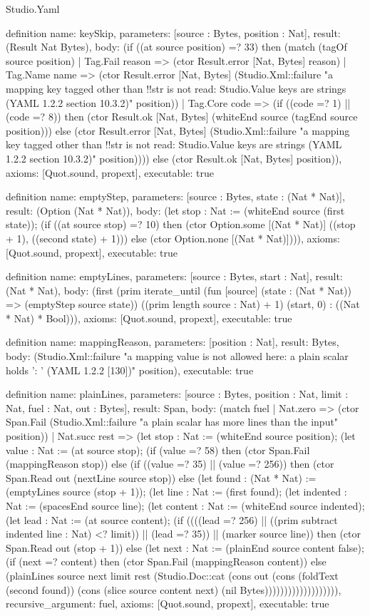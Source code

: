 \begin{lexlean}{Studio.Yaml}
\begin{semanticmodule}
definition{
  name: keySkip,
  parameters: [source : Bytes, position : Nat],
  result: (Result Nat Bytes),
  body: (if ((at source position) =? 33) then (match (tagOf source position)
    | Tag.Fail reason => (ctor Result.error [Nat, Bytes] reason)
    | Tag.Name name => (ctor Result.error [Nat, Bytes] (Studio.Xml::failure "a mapping key tagged other than !!str is not read: Studio.Value keys are strings (YAML 1.2.2 section 10.3.2)" position))
    | Tag.Core code => (if ((code =? 1) || (code =? 8)) then (ctor Result.ok [Nat, Bytes] (whiteEnd source (tagEnd source position))) else (ctor Result.error [Nat, Bytes] (Studio.Xml::failure "a mapping key tagged other than !!str is not read: Studio.Value keys are strings (YAML 1.2.2 section 10.3.2)" position)))) else (ctor Result.ok [Nat, Bytes] position)),
  axioms: [Quot.sound, propext],
  executable: true
}

definition{
  name: emptyStep,
  parameters: [source : Bytes, state : (Nat * Nat)],
  result: (Option (Nat * Nat)),
  body: (let stop : Nat := (whiteEnd source (first state)); (if ((at source stop) =? 10) then (ctor Option.some [(Nat * Nat)] ((stop + 1), ((second state) + 1))) else (ctor Option.none [(Nat * Nat)]))),
  axioms: [Quot.sound, propext],
  executable: true
}

definition{
  name: emptyLines,
  parameters: [source : Bytes, start : Nat],
  result: (Nat * Nat),
  body: (first (prim iterate_until (fun [source] (state : (Nat * Nat)) => (emptyStep source state)) ((prim length source : Nat) + 1) (start, 0) : ((Nat * Nat) * Bool))),
  axioms: [Quot.sound, propext],
  executable: true
}

definition{
  name: mappingReason,
  parameters: [position : Nat],
  result: Bytes,
  body: (Studio.Xml::failure "a mapping value is not allowed here: a plain scalar holds ': ' (YAML 1.2.2 [130])" position),
  executable: true
}

definition{
  name: plainLines,
  parameters: [source : Bytes, position : Nat, limit : Nat, fuel : Nat, out : Bytes],
  result: Span,
  body: (match fuel
    | Nat.zero => (ctor Span.Fail (Studio.Xml::failure "a plain scalar has more lines than the input" position))
    | Nat.succ rest => (let stop : Nat := (whiteEnd source position); (let value : Nat := (at source stop); (if (value =? 58) then (ctor Span.Fail (mappingReason stop)) else (if ((value =? 35) || (value =? 256)) then (ctor Span.Read out (nextLine source stop)) else (let found : (Nat * Nat) := (emptyLines source (stop + 1)); (let line : Nat := (first found); (let indented : Nat := (spacesEnd source line); (let content : Nat := (whiteEnd source indented); (let lead : Nat := (at source content); (if ((((lead =? 256) || ((prim subtract indented line : Nat) <? limit)) || (lead =? 35)) || (marker source line)) then (ctor Span.Read out (stop + 1)) else (let next : Nat := (plainEnd source content false); (if (next =? content) then (ctor Span.Fail (mappingReason content)) else (plainLines source next limit rest (Studio.Doc::cat (cons out (cons (foldText (second found)) (cons (slice source content next) (nil Bytes))))))))))))))))))),
  recursive_argument: fuel,
  axioms: [Quot.sound, propext],
  executable: true
}


\end{semanticmodule}
\end{lexlean}
